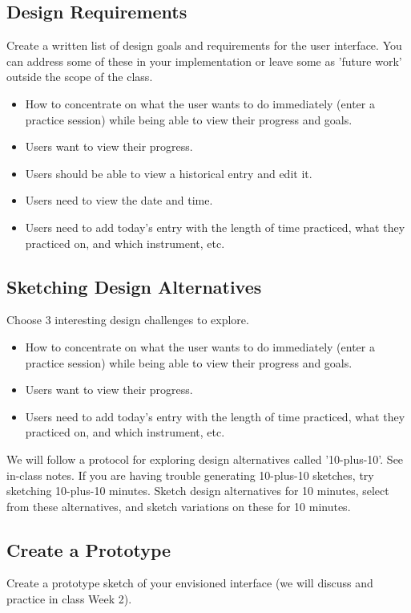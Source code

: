 \documentclass{article}
\begin{document}
\subsection{Design Requirements}
Create a written list of design goals and requirements for the user interface. You can address some of these in your implementation or leave some as 'future work' outside the scope of the class.

\begin{itemize}
    \item How to concentrate on what the user wants to do immediately (enter a practice session) while being able to view their progress and goals.
    \item Users want to view their progress.
    \item Users should be able to view a historical entry and edit it.
    \item Users need to view the date and time.
    \item Users need to add today’s entry with the length of time practiced, what they practiced on, and which instrument, etc.
\end{itemize}

\subsection{Sketching Design Alternatives}
Choose 3 interesting design challenges to explore.

\begin{itemize}
    \item How to concentrate on what the user wants to do immediately (enter a practice session) while being able to view their progress and goals.
    \item Users want to view their progress.
    \item Users need to add today’s entry with the length of time practiced, what they practiced on, and which instrument, etc.
\end{itemize}

We will follow a protocol for exploring design alternatives called '10-plus-10'. See in-class notes.  
If you are having trouble generating 10-plus-10 sketches, try sketching 10-plus-10 minutes. Sketch design alternatives for 10 minutes, select from these alternatives, and sketch variations on these for 10 minutes.

\subsection{Create a Prototype}
Create a prototype sketch of your envisioned interface (we will discuss and practice in class Week 2).
\end{document}

